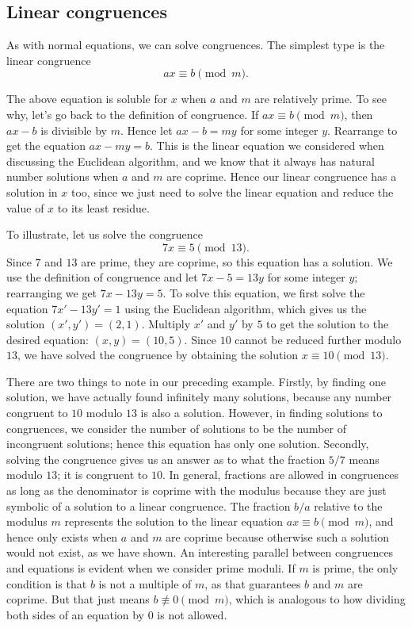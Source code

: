 \subsection{Linear congruences}
As with normal equations, we can solve congruences. The simplest type is the linear congruence
\[ax\equiv b\pmod{m}.\]

The above equation is soluble for \(x\) when \(a\) and \(m\) are relatively prime. To see why, let's
go back to the definition of congruence. If \(ax\equiv b\pmod{m}\), then \(ax-b\) is divisible by \(m\).
Hence let \(ax-b=my\) for some integer \(y\). Rearrange to get the equation \(ax-my=b\). This is
the linear equation we considered when discussing the Euclidean algorithm, and we know that it
always has natural number solutions when \(a\) and \(m\) are coprime. Hence our linear congruence
has a solution in \(x\) too, since we just need to solve the linear equation and reduce the value
of \(x\) to its least residue.

To illustrate, let us solve the congruence \[ 7x\equiv5\pmod{13}.\] Since \(7\) and \(13\) are prime,
they are coprime, so this equation has a solution. We use the definition of congruence and let
\(7x-5=13y\) for some integer \(y\); rearranging we get \(7x-13y=5\). To solve this equation, we first
solve the equation \(7x'-13y'=1\) using the Euclidean algorithm, which gives us the solution \((x',y')=(2,1)\).
Multiply \(x'\) and \(y'\) by \(5\) to get the solution to the desired equation: \((x,y)=(10,5)\). Since \(10\)
cannot be reduced further modulo \(13\), we have solved the congruence by obtaining the solution \(x\equiv10\pmod{13}\).

There are two things to note in our preceding example. Firstly, by finding one solution, we have actually
found infinitely many solutions, because any number congruent to \(10\) modulo \(13\) is also a solution.
However, in finding solutions to congruences, we consider the number of solutions to be the number of
incongruent solutions; hence this equation has only one solution. Secondly, solving the congruence
gives us an answer as to what the fraction \(5/7\) means modulo \(13\); it is congruent to \(10\). In general,
fractions are allowed in congruences as long as the denominator is coprime with the modulus because
they are just symbolic of a solution to a linear congruence. The fraction \(b/a\) relative to the modulus \(m\) represents the solution
to the linear equation \(ax\equiv b\pmod{m}\), and hence only exists when \(a\) and \(m\) are coprime
because otherwise such a solution would not exist, as we have shown. An interesting parallel between
congruences and equations is evident when we consider prime moduli. If \(m\) is prime, the only
condition is that \(b\) is not a multiple of \(m\), as that guarantees \(b\) and \(m\) are coprime. But that
just means \(b\not\equiv0\pmod{m}\), which is analogous to how dividing both sides of an equation by \(0\) is not allowed.

